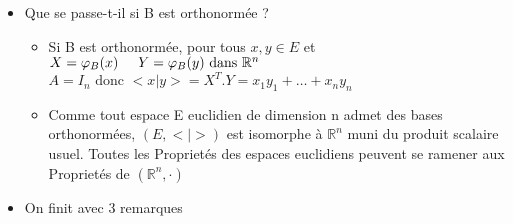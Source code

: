 \documentclass{article}
\newcommand\tab[1][1cm]{\hspace*{#1}}
\begin{document}
\begin{itemize}
    \item Que se passe-t-il si B est orthonormée ?
    \begin{itemize}
        \item[] Si B est orthonormée, pour tous $x, y \in E$ et \\
    $X = \varphi_B(x) \tab[0.5cm] Y = \varphi_B(y) \mbox{ dans } \mathbb{R}^n$\\
    $A = I_n \mbox{ donc } <x|y> = X^T . Y = x_1 y_1 + \dots + x_n y_n$
        \item[] Comme tout espace E euclidien de dimension n admet des bases orthonormées, $(E, <|>)$ est isomorphe à $\mathbb{R}^n$ muni du produit scalaire usuel. Toutes les Proprietés des espaces euclidiens peuvent se ramener aux Proprietés de $(\mathbb{R}^n, \cdot)$
    \end{itemize}
    \item On finit avec 3 remarques
\end{itemize}
\end{document}
